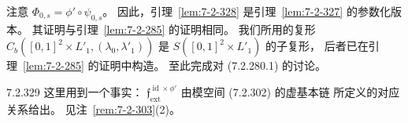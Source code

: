 注意 $\Phi_{0,s}=\phi'\circ\psi_{0,s}$。
因此，引理~\ref{lem:7-2-328}
是引理~\ref{lem:7-2-327}
的参数化版本。
其证明与引理~\ref{lem:7-2-285}
的证明相同。
我们所用的复形
$C_b([0,1]^2\times L'_1,(\lambda_0,\lambda'_1))$
是
$S([0,1]^2\times L'_1)$
的子复形，
后者已在引理~\ref{lem:7-2-285}
的证明中构造。
至此完成对 (7.2.280.1) 的讨论。

\begin{remark}{7.2.329}\label{rem:7-2-329}
这里用到一个事实：
$\mathfrak f^{\operatorname{id}\times\phi'}_{\mathrm{ext}}$
由模空间 (7.2.302) 的虚基本链
所定义的对应关系给出。
见注~\ref{rem:7-2-303}(2)。
\end{remark}
